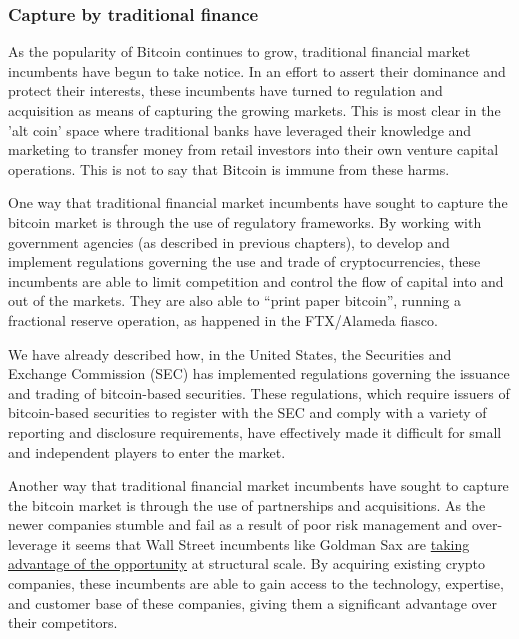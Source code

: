 \subsubsection{Capture by traditional finance}
As the popularity of Bitcoin continues to grow, traditional financial market incumbents have begun to take notice. In an effort to assert their dominance and protect their interests, these incumbents have turned to regulation and acquisition as means of capturing the growing markets. This is most clear in the 'alt coin' space where traditional banks have leveraged their knowledge and marketing to transfer money from retail investors into their own venture capital operations. This is not to say that Bitcoin is immune from these harms.\par
One way that traditional financial market incumbents have sought to capture the bitcoin market is through the use of regulatory frameworks. By working with government agencies (as described in previous chapters), to develop and implement regulations governing the use and trade of cryptocurrencies, these incumbents are able to limit competition and control the flow of capital into and out of the markets. They are also able to ``print paper bitcoin'', running a fractional reserve operation, as happened in the FTX/Alameda fiasco.\par
We have already described how, in the United States, the Securities and Exchange Commission (SEC) has implemented regulations governing the issuance and trading of bitcoin-based securities. These regulations, which require issuers of bitcoin-based securities to register with the SEC and comply with a variety of reporting and disclosure requirements, have effectively made it difficult for small and independent players to enter the market. \par
Another way that traditional financial market incumbents have sought to capture the bitcoin market is through the use of partnerships and acquisitions. As the newer companies stumble and fail as a result of poor risk management and over-leverage it seems that Wall Street incumbents like Goldman Sax are \href{https://www.reuters.com/technology/goldman-sachs-hunt-bargain-crypto-firms-after-ftx-fiasco-2022-12-06/}{taking advantage of the opportunity} at structural scale. By acquiring existing crypto companies, these incumbents are able to gain access to the technology, expertise, and customer base of these companies, giving them a significant advantage over their competitors.\par
